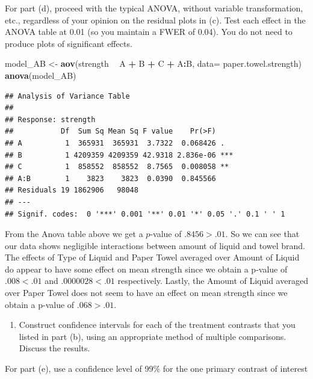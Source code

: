 \documentclass[12pt,]{article}
\newenvironment{Shaded}{\begin{snugshade}}{\end{snugshade}}
\newcommand{\KeywordTok}[1]{\textcolor[rgb]{0.13,0.29,0.53}{\textbf{#1}}}
\newcommand{\DataTypeTok}[1]{\textcolor[rgb]{0.13,0.29,0.53}{#1}}
\newcommand{\StringTok}[1]{\textcolor[rgb]{0.31,0.60,0.02}{#1}}
\newcommand{\OperatorTok}[1]{\textcolor[rgb]{0.81,0.36,0.00}{\textbf{#1}}}
\newcommand{\NormalTok}[1]{#1}
\providecommand{\tightlist}{%
  \setlength{\itemsep}{0pt}\setlength{\parskip}{0pt}}
\begin{document}
For part (d), proceed with the typical ANOVA, without variable
transformation, etc., regardless of your opinion on the residual plots
in (c). Test each effect in the ANOVA table at 0.01 (so you maintain a
FWER of 0.04). You do not need to produce plots of significant effects.

\begin{Shaded}
\begin{Highlighting}[]
\NormalTok{model_AB <-}\StringTok{ }\KeywordTok{aov}\NormalTok{(strength }\OperatorTok{~}\StringTok{ }\NormalTok{A }\OperatorTok{+}\StringTok{ }\NormalTok{B }\OperatorTok{+}\StringTok{ }\NormalTok{C }\OperatorTok{+}\StringTok{ }\NormalTok{A}\OperatorTok{:}\NormalTok{B, }\DataTypeTok{data=}\NormalTok{ paper.towel.strength)}
\KeywordTok{anova}\NormalTok{(model_AB)}
\end{Highlighting}
\end{Shaded}

\begin{verbatim}
## Analysis of Variance Table
## 
## Response: strength
##           Df  Sum Sq Mean Sq F value    Pr(>F)    
## A          1  365931  365931  3.7322  0.068426 .  
## B          1 4209359 4209359 42.9318 2.836e-06 ***
## C          1  858552  858552  8.7565  0.008058 ** 
## A:B        1    3823    3823  0.0390  0.845566    
## Residuals 19 1862906   98048                      
## ---
## Signif. codes:  0 '***' 0.001 '**' 0.01 '*' 0.05 '.' 0.1 ' ' 1
\end{verbatim}

From the Anova table above we get a \(p\)-value of \(.8456 > .01\). So
we can see that our data shows negligible interactions between amount of
liquid and towel brand. The effects of Type of Liquid and Paper Towel
averaged over Amount of Liquid do appear to have some effect on mean
strength since we obtain a p-value of \(.008< .01\) and
\(.0000028 < .01\) respectively. Lastly, the Amount of Liquid averaged
over Paper Towel does not seem to have an effect on mean strength since
we obtain a p-value of \(.068 > .01\).

\begin{enumerate}
\def\labelenumi{(\alph{enumi})}
\setcounter{enumi}{4}
\tightlist
\item
  Construct confidence intervals for each of the treatment contrasts
  that you listed in part (b), using an appropriate method of multiple
  comparisons. Discuss the results.
\end{enumerate}

For part (e), use a confidence level of 99\% for the one primary
contrast of interest
\end{document}
